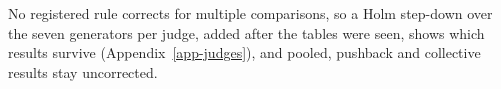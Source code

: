 No registered rule corrects for multiple comparisons, so a Holm step-down
over the seven generators per judge, added after the tables were seen, shows
which results survive (Appendix~\ref{app-judges}), and pooled, pushback and
collective results stay uncorrected.
